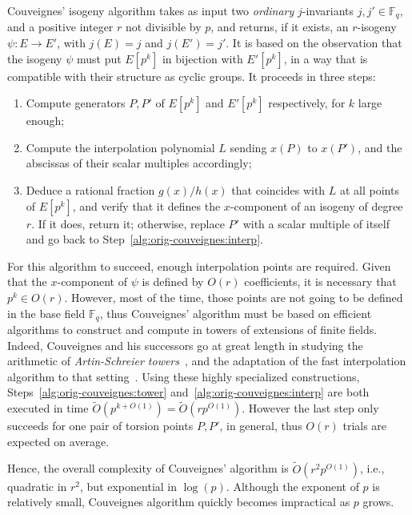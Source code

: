\documentclass{lms}
\newcommand{\F}{\mathbb{F}}
\newcommand{\tildO}{\tilde{O}}
\begin{document}
Couveignes' isogeny algorithm takes as input two \emph{ordinary}
$j$-invariants $j,j'∈\F_q$, and a positive integer $r$ not
divisible by $p$, and returns, if it exists, an
$r$-isogeny $ψ:E\to E'$, with $j(E)=j$ and $j(E')=j'$. It is based on the observation that the
isogeny $ψ$ must put $E[p^k]$ in bijection with $E'[p^k]$, in a way
that is compatible with their structure as cyclic groups.
It proceeds in three steps:
\begin{enumerate}
\item\label{alg:orig-couveignes:tower} Compute generators $P,P'$ of
  $E[p^k]$ and $E'[p^k]$ respectively, for $k$ large enough;
\item\label{alg:orig-couveignes:interp} Compute the interpolation
  polynomial $L$ sending $x(P)$ to $x(P')$, and the abscissas of
  their scalar multiples accordingly;
\item\label{alg:orig-couveignes:rational} Deduce a rational fraction $g(x)/h(x)$
  that coincides with $L$ at all points of $E[p^k]$, and verify that
  it defines the $x$-component of an isogeny of degree $r$. If it
  does, return it; otherwise, replace $P'$ with a scalar multiple of
  itself and go back to Step~\ref{alg:orig-couveignes:interp}.
\end{enumerate}

For this algorithm to succeed, enough interpolation points are
required. Given that the $x$-component of $ψ$ is defined by $O(r)$ coefficients,
it is necessary that $p^k∈O(r)$. However, most of
the time, those points are not going to be defined in the base field
$\F_q$, thus Couveignes' algorithm must be based on efficient
algorithms to construct and compute in towers of extensions of finite
fields. Indeed, Couveignes and his successors go at great length in
studying the arithmetic of \emph{Artin-Schreier
  towers}~\cite{couveignes00,df+schost12}, and the adaptation of the
fast interpolation algorithm to that setting~\cite{df10}.  Using these
highly specialized constructions,
Steps~\ref{alg:orig-couveignes:tower}
and~\ref{alg:orig-couveignes:interp} are both executed in 
time $\tildO(p^{k+O(1)})=\tildO(rp^{O(1)})$. However the last step
only succeeds for one pair of torsion points $P,P'$, in general, thus
$O(r)$ trials are expected on average.

Hence, the overall complexity of Couveignes' algorithm is
$\tildO(r^2p^{O(1)})$, i.e., quadratic in $r^2$, but exponential in
$\log(p)$. Although the exponent of $p$ is relatively small,
Couveignes algorithm quickly becomes impractical as $p$ grows.
\end{document}
